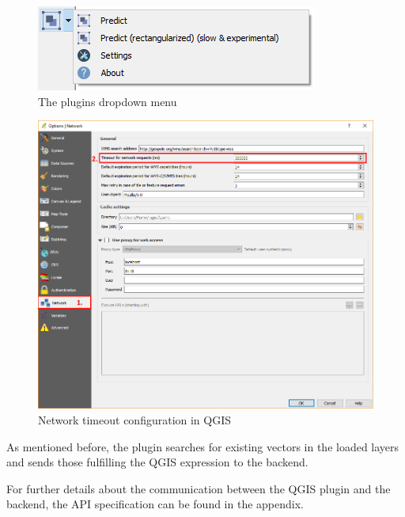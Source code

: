\begin{figure}[H]
    \centering
	\includegraphics[width=0.5\linewidth]{chapters/introduction/images/plugin_dropdown.png}
	\caption{The plugins dropdown menu}
	\label{fig:introduction:plugin_dropdown}
\end{figure}

\begin{figure}[H]
    \centering
	\includegraphics[width=0.8\linewidth]{chapters/introduction/images/qgs_timeout.png}
	\caption{Network timeout configuration in QGIS}
	\label{fig:introduction:qgis_timeout}
\end{figure}

As mentioned before, the plugin searches for existing vectors in the loaded layers and sends those fulfilling the QGIS expression \textbf{} to the backend.

For further details about the communication between the QGIS plugin and the backend, the API specification can be found in the appendix.
